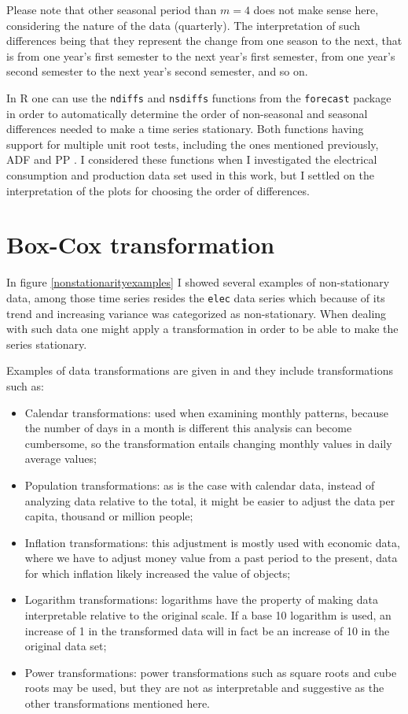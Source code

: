 \documentclass[12pt,a4paper,titlepage]{report}
\begin{document}
Please note that other seasonal period than $ m = 4 $ does not make sense here, considering the nature of the data (quarterly). The interpretation of such differences being that they represent the change from one season to the next, that is from one year's first semester to the next year's first semester, from one year's second semester to the next year's second semester, and so on.

In R one can use the \texttt{ndiffs} and \texttt{nsdiffs} functions from the \texttt{forecast} package in order to automatically determine the order of non-seasonal and seasonal differences needed to make a time series stationary. Both functions having support for multiple unit root tests, including the ones mentioned previously, ADF \cite{adftest} and PP \cite{unitroottestsPhillips}. I considered these functions when I investigated the electrical consumption and production data set used in this work, but I settled on the interpretation of the plots for choosing the order of differences.

\section{Box-Cox transformation} \label{boxcoxtransformation}

In figure \ref{nonstationarityexamples} I showed several examples of non-stationary data, among those time series resides the \texttt{elec} data series which because of its trend and increasing variance was categorized as non-stationary. When dealing with such data one might apply a transformation in order to be able to make the series stationary.

Examples of data transformations are given in \cite{fpp2transformations} and they include transformations such as:
\begin{itemize}
    \item Calendar transformations: used when examining monthly patterns, because the number of days in a month is different this analysis can become cumbersome, so the transformation entails changing monthly values in daily average values;
    \item Population transformations: as is the case with calendar data, instead of analyzing data relative to the total, it might be easier to adjust the data per capita, thousand or million people;
    \item Inflation transformations: this adjustment is mostly used with economic data, where we have to adjust money value from a past period to the present, data for which inflation likely increased the value of objects;
    \item Logarithm transformations: logarithms have the property of making data interpretable relative to the original scale. If a base 10 logarithm is used, an increase of 1 in the transformed data will in fact be an increase of 10 in the original data set;
    \item Power transformations: power transformations such as square roots and cube roots may be used, but they are not as interpretable and suggestive as the other transformations mentioned here.
\end{itemize}
\end{document}
